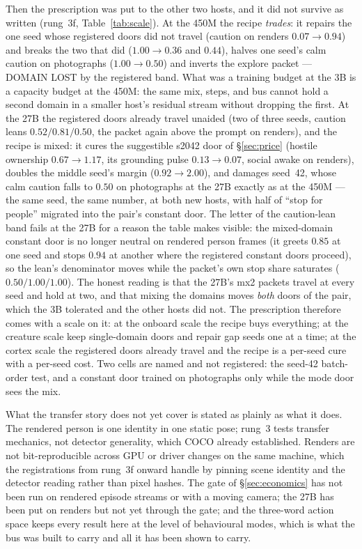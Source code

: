 \documentclass[11pt]{article}
\begin{document}
Then the prescription was put to the other two hosts, and it did not
survive as written (rung~3f, Table~\ref{tab:scale}). At the 450M the
recipe \emph{trades}: it repairs the one seed whose registered doors did
not travel (caution on renders $0.07\to0.94$) and breaks the two that
did ($1.00\to0.36$ and $0.44$), halves one seed's calm caution on
photographs ($1.00\to0.50$) and inverts the explore packet --- DOMAIN
LOST by the registered band. What was a training budget at the 3B is a
capacity budget at the 450M: the same mix, steps, and bus cannot hold a
second domain in a smaller host's residual stream without dropping the
first. At the 27B the registered doors already travel unaided (two of
three seeds, caution leans $0.52 / 0.81 / 0.50$, the packet again above
the prompt on renders), and the recipe is mixed: it cures the
suggestible s2042 door of \S\ref{sec:price} (hostile ownership
$0.67\to1.17$, its grounding pulse $0.13\to0.07$, social awake on
renders), doubles the middle seed's margin ($0.92\to2.00$), and damages
seed~42, whose calm caution falls to $0.50$ on photographs at the 27B
exactly as at the 450M --- the same seed, the same number, at both new
hosts, with half of ``stop for people'' migrated into the pair's
constant door. The letter of the caution-lean band fails at the 27B for
a reason the table makes visible: the mixed-domain constant door is no
longer neutral on rendered person frames (it greets $0.85$ at one seed
and stops $0.94$ at another where the registered constant doors
proceed), so the lean's denominator moves while the packet's own stop
share saturates ($0.50 / 1.00 / 1.00$). The honest reading is that the
27B's mx2 packets travel at every seed and hold at two, and that mixing
the domains moves \emph{both} doors of the pair, which the 3B tolerated
and the other hosts did not. The prescription therefore comes with a
scale on it: at the onboard scale the recipe buys everything; at the
creature scale keep single-domain doors and repair gap seeds one at a
time; at the cortex scale the registered doors already travel and the
recipe is a per-seed cure with a per-seed cost. Two cells are named
and not registered: the seed-42 batch-order test, and a constant door
trained on photographs only while the mode door sees the mix.

What the transfer story does not yet cover is stated as plainly as
what it does. The rendered person is one identity in one static pose;
rung~3 tests transfer mechanics, not detector generality, which COCO
already established. Renders are not bit-reproducible across GPU or
driver changes on the same machine, which the registrations from rung~3f
onward handle by pinning scene identity and the detector reading
rather than pixel hashes. The gate of \S\ref{sec:economics} has not
been run on rendered episode streams or with a moving camera; the
27B has been put on renders but not yet through the gate; and the
three-word action space keeps every result here at the level of
behavioural modes, which is what the bus was built to carry and all it
has been shown to carry.
\end{document}
